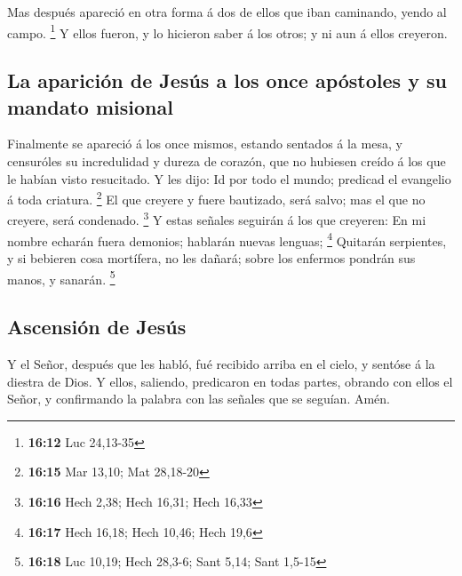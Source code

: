  Mas después apareció en otra forma á dos de ellos que
iban caminando, yendo al campo. \footnote{\textbf{16:12} Luc 24,13-35}
 Y ellos fueron, y lo hicieron saber á los otros; y ni
aun á ellos creyeron.

\hypertarget{la-apariciuxf3n-de-jesuxfas-a-los-once-apuxf3stoles-y-su-mandato-misional}{%
\subsection{La aparición de Jesús a los once apóstoles y su mandato
misional}\label{la-apariciuxf3n-de-jesuxfas-a-los-once-apuxf3stoles-y-su-mandato-misional}}

 Finalmente se apareció á los once mismos, estando
sentados á la mesa, y censuróles su incredulidad y dureza de corazón,
que no hubiesen creído á los que le habían visto resucitado.
 Y les dijo: Id por todo el mundo; predicad el evangelio
á toda criatura. \footnote{\textbf{16:15} Mar 13,10; Mat 28,18-20}
 El que creyere y fuere bautizado, será salvo; mas el que
no creyere, será condenado. \footnote{\textbf{16:16} Hech 2,38; Hech
  16,31; Hech 16,33}  Y estas señales seguirán á los que
creyeren: En mi nombre echarán fuera demonios; hablarán nuevas lenguas;
\footnote{\textbf{16:17} Hech 16,18; Hech 10,46; Hech 19,6}
 Quitarán serpientes, y si bebieren cosa mortífera, no
les dañará; sobre los enfermos pondrán sus manos, y sanarán. \footnote{\textbf{16:18}
  Luc 10,19; Hech 28,3-6; Sant 5,14; Sant 1,5-15}

\hypertarget{ascensiuxf3n-de-jesuxfas}{%
\subsection{Ascensión de Jesús}\label{ascensiuxf3n-de-jesuxfas}}

 Y el Señor, después que les habló, fué recibido arriba
en el cielo, y sentóse á la diestra de Dios.  Y ellos,
saliendo, predicaron en todas partes, obrando con ellos el Señor, y
confirmando la palabra con las señales que se seguían. Amén.
